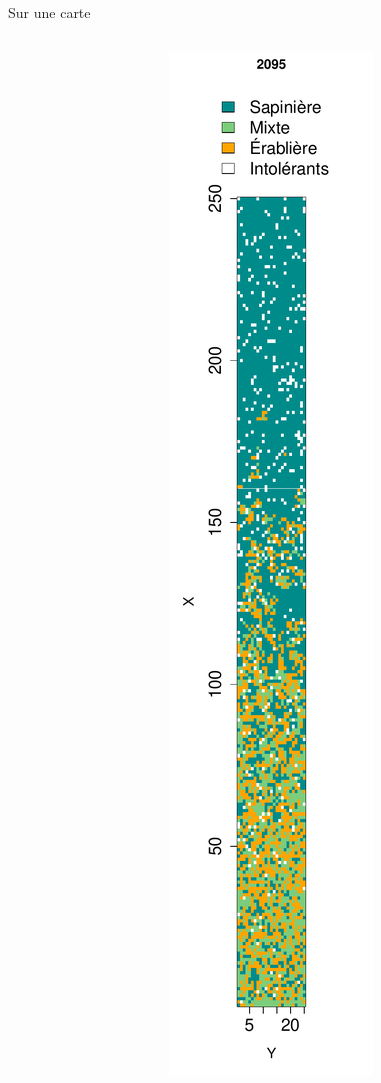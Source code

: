 \documentclass{eecslides}
\begin{document}
\begin{frame}{Sur une carte}
\begin{columns}
\begin{column}{0.25\textwidth}
\begin{center}
				\end{center}	
			\end{column}
			\begin{column}{0.25\textwidth}
				\begin{center}
					\includegraphics[height=0.8\textheight]{largeplot_2095}
				\end{center}	
			\end{column}						
		\end{columns}	    
	\end{frame}
\end{document}
